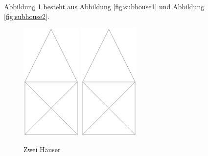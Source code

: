 \documentclass[12pt,a4paper]{book}
\begin{document}
Abbildung \ref{fig:subhouses} besteht aus Abbildung \ref{fig:subhouse1} und Abbildung \ref{fig:subhouse2}.
\begin{figure}[htb]
	\centering
	{\includegraphics[width=3cm]{house/house.png}}
	\hfil
	{\includegraphics[width=3cm,angle=180]{house/house.png}}
	\caption{Zwei Häuser}\label{fig:subhouses}
\end{figure}
\end{document}
